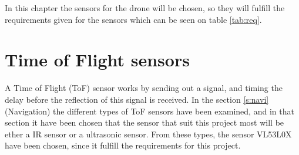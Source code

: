 In this chapter the sensors for the drone will be chosen, so they will fulfill the requirements given for the sensors which can be seen on table \ref{tab:req}.
\section{Time of Flight sensors}\label{s:sensor_choice}
A Time of Flight (ToF) sensor works by sending out a signal, and timing the delay before the reflection of this signal is received. In the section \ref{s:navi} (Navigation) the different types of ToF sensors have been examined, and in that section it have been chosen that the sensor that suit this project most will be ether a IR sensor or a ultrasonic sensor. From these types, the sensor VL53L0X have been chosen, since it fulfill the requirements for this project.

